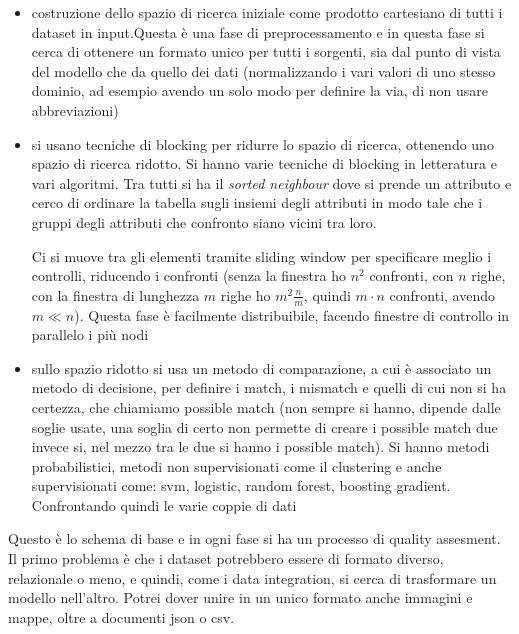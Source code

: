 \begin{itemize}
    \item costruzione dello spazio di ricerca iniziale come prodotto cartesiano di tutti i dataset in input.Questa è una fase di preprocessamento e in questa fase si cerca di ottenere un formato unico per tutti i sorgenti, sia dal punto di vista del modello che da quello dei dati (normalizzando i vari valori di uno stesso dominio, ad esempio avendo un solo modo per definire la via, di non usare abbreviazioni) 
    \item si usano tecniche di blocking per ridurre lo spazio di ricerca, ottenendo uno spazio di ricerca ridotto. Si hanno varie tecniche di blocking in letteratura e vari algoritmi. Tra tutti si ha il \textit{sorted neighbour} dove si prende un attributo e cerco di ordinare la tabella sugli insiemi degli attributi in modo tale che i gruppi degli attributi che confronto siano vicini tra loro. 
    
    Ci si muove tra gli elementi tramite sliding window per specificare meglio i controlli, riducendo i confronti (senza la finestra ho $n^2$ confronti, con $n$ righe, con la finestra di lunghezza $m$ righe ho $m^2\frac{n}{m}$, quindi $m\cdot n$ confronti, avendo $m\ll n$). Questa fase è facilmente distribuibile, facendo finestre di controllo in parallelo i più nodi 
    \item sullo spazio ridotto si usa un metodo di comparazione, a cui è associato un metodo di decisione, per definire i match, i mismatch e quelli di cui non si ha certezza, che chiamiamo possible match (non sempre si hanno, dipende dalle soglie usate, una soglia di certo non permette di creare i possible match due invece si, nel mezzo tra le due si hanno i possible match). Si hanno metodi probabilistici, metodi non supervisionati come il clustering e anche supervisionati come:
    svm, logistic, random forest, boosting gradient.  Confrontando quindi le varie coppie di dati
\end{itemize}
Questo è lo schema di base e in ogni fase si ha un processo di quality assesment.\\
Il primo problema è che i dataset potrebbero essere di formato diverso, relazionale o meno, e quindi, come i data integration, si cerca di trasformare un modello nell'altro. Potrei dover unire in un unico formato anche immagini e mappe, oltre a documenti json o csv.\\ 

